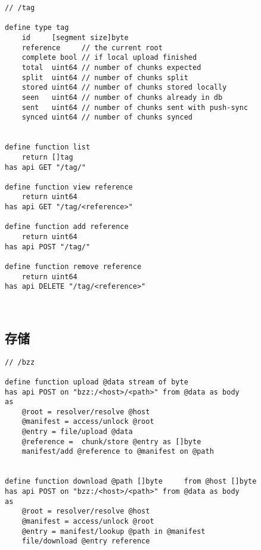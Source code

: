 \begin{definition}[Tags]\label{def:tags}
\begin{lstlisting}[language=buzz1]
// /tag

define type tag
    id     [segment size]byte
    reference     // the current root
    complete bool // if local upload finished
    total  uint64 // number of chunks expected
    split  uint64 // number of chunks split
    stored uint64 // number of chunks stored locally
    seen   uint64 // number of chunks already in db
    sent   uint64 // number of chunks sent with push-sync
    synced uint64 // number of chunks synced


define function list
    return []tag
has api GET "/tag/"

define function view reference
    return uint64
has api GET "/tag/<reference>"
    
define function add reference
    return uint64
has api POST "/tag/"

define function remove reference
    return uint64
has api DELETE "/tag/<reference>"
    
       
\end{lstlisting}
\end{definition}

\subsection{存储}\label{spec:format:bzz-api}


\begin{definition}\label{def:bzz}
\begin{lstlisting}[language=buzz1]
// /bzz

define function upload @data stream of byte
has api POST on "bzz:/<host>/<path>" from @data as body
as
    @root = resolver/resolve @host
    @manifest = access/unlock @root
    @entry = file/upload @data
    @reference =  chunk/store @entry as []byte
    manifest/add @reference to @manifest on @path


define function download @path []byte     from @host []byte
has api POST on "bzz:/<host>/<path>" from @data as body
as
    @root = resolver/resolve @host
    @manifest = access/unlock @root
    @entry = manifest/lookup @path in @manifest
    file/download @entry reference
\end{lstlisting}
\end{definition}
